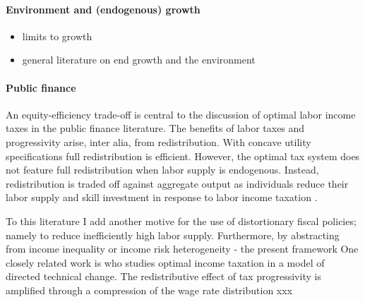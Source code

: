 \paragraph{Environment and (endogenous) growth}
\begin{itemize}
	\item limits to growth
	\item general literature on end growth and the environment
\end{itemize}
\paragraph{Public finance}
An equity-efficiency trade-off is central to the discussion of optimal labor income taxes in the public finance literature.  The benefits of labor taxes and progressivity arise, inter alia, from redistribution. %
With concave utility specifications full redistribution is efficient. However, the optimal tax system does not feature full redistribution when labor supply is endogenous. Instead, redistribution is traded off against aggregate output as individuals reduce their labor supply and skill investment in response to labor income taxation \citep{Heathcote2017OptimalFramework, Conesa2009TaxingAll, Domeij2004OnTaxes}.

To this literature I add another motive for the use of distortionary fiscal policies; namely to reduce inefficiently high labor supply. Furthermore, by abstracting from income inequality or income risk heterogeneity - the present framework
One closely related work is \cite{Loebbing2019NationalChange} who studies optimal income taxation in a model of directed technical change. The redistributive effect of tax progressivity is amplified through a compression of the wage rate distribution xxx